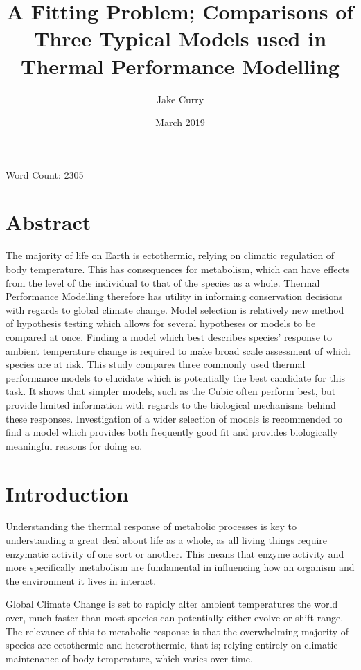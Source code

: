 \documentclass[11pt]{article}
\title{A Fitting Problem; Comparisons of Three Typical Models used in Thermal Performance Modelling}
\author{Jake Curry }
\affil{Department of Life Sciences, Imperial College London}
\date{March 2019}
\begin{document}
\maketitle
\begin{center}
   Word Count: 2305
\end{center}
\newpage
\section{Abstract }
The majority of life on Earth is ectothermic, relying on climatic regulation of body temperature. This has consequences for metabolism, which can have effects from the level of the individual to that of the species as a whole.
Thermal Performance Modelling therefore has utility in informing conservation decisions with regards to global climate change. Model selection is relatively new method of hypothesis testing which allows for several hypotheses or models to be compared at once. Finding a model which best describes species' response to ambient temperature change is required to make broad scale assessment of which species are at risk. 
This study compares three commonly used thermal performance models to elucidate which is potentially the best candidate for this task. It shows that simpler models, such as the Cubic often perform best, but provide limited information with regards to the biological mechanisms behind these responses. Investigation of a wider selection of models is recommended to find a model which provides both frequently good fit and provides biologically meaningful reasons for doing so. 

\section{Introduction}
Understanding the thermal response of metabolic processes is key to understanding a great deal about life as a whole, as all living things require enzymatic activity of one sort or another. This means that enzyme activity and more specifically metabolism are fundamental in influencing how an organism and the environment it lives in interact. 

Global Climate Change is set to rapidly alter ambient temperatures the world over, much faster than most species can potentially either evolve or shift range\citep{Visser2008, Thomas2012, Jaeschke2013, Gilman2010}. The relevance of this to metabolic response is that the overwhelming majority of species are ectothermic and heterothermic, that is; relying entirely on climatic maintenance of body temperature, which varies over time.  
\end{document}

